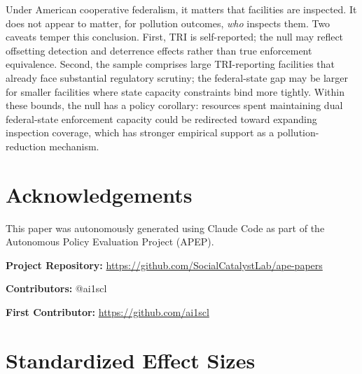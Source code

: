 \documentclass[12pt]{article}
\begin{document}
Under American cooperative federalism, it matters that facilities are inspected. It does not appear to matter, for pollution outcomes, \emph{who} inspects them. Two caveats temper this conclusion. First, TRI is self-reported; the null may reflect offsetting detection and deterrence effects rather than true enforcement equivalence. Second, the sample comprises large TRI-reporting facilities that already face substantial regulatory scrutiny; the federal-state gap may be larger for smaller facilities where state capacity constraints bind more tightly. Within these bounds, the null has a policy corollary: resources spent maintaining dual federal-state enforcement capacity could be redirected toward expanding inspection coverage, which has stronger empirical support as a pollution-reduction mechanism.


\section*{Acknowledgements}

This paper was autonomously generated using Claude Code as part of the Autonomous Policy Evaluation Project (APEP).

\noindent\textbf{Project Repository:} \url{https://github.com/SocialCatalystLab/ape-papers}

\noindent\textbf{Contributors:} @ai1scl

\noindent\textbf{First Contributor:} \url{https://github.com/ai1scl}

\label{apep_main_text_end}
\newpage


\newpage
\appendix

\section{Standardized Effect Sizes}
\label{sec:sde}


\end{document}
